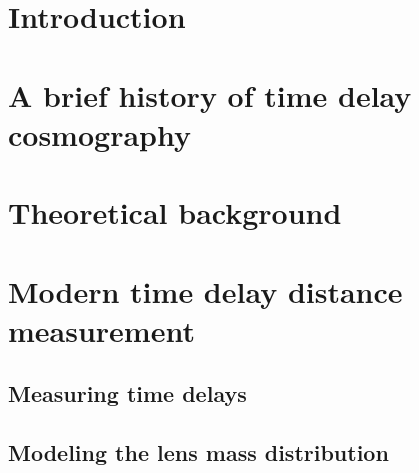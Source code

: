 \documentclass[smallextended]{svjour3}       %
\begin{document}

\section{Introduction}
\label{sec:intro}




\section{A brief history of time delay cosmography}
\label{sec:history}




\section{Theoretical background}
\label{sec:theory}




\section{Modern time delay distance measurement}
\label{sec:measurement}




\subsection{Measuring time delays}
\label{ssec:timedelay}




\subsection{Modeling the lens mass distribution}
\label{ssec:lensmodel}


\end{document}
